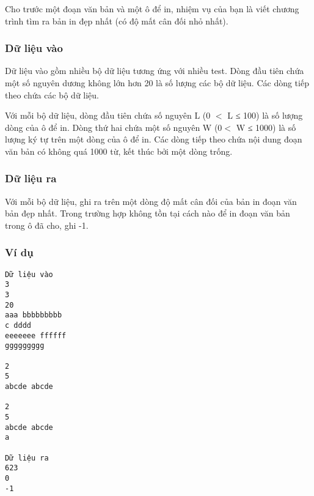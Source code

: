    Cho trước một đoạn văn bản và một ô để in, nhiệm vụ của bạn là viết chương trình tìm ra bản in đẹp nhất (có độ mất cân đối nhỏ nhất).  

\subsubsection{   Dữ liệu vào  }

   Dữ liệu vào gồm nhiều bộ dữ liệu tương ứng với nhiều test. Dòng đầu tiên chứa một số nguyên dương không lớn hơn 20 là số lượng các bộ dữ liệu. Các dòng tiếp theo chứa các bộ dữ liệu.  

   Với mỗi bộ dữ liệu, dòng đầu tiên chứa số nguyên L (0 $<$ L ≤ 100) là số lượng dòng của ô để in. Dòng thứ hai chứa một số nguyên W (0$<$ W ≤ 1000) là số lượng ký tự trên một dòng của ô để in. Các dòng tiếp theo chứa nội dung đoạn văn bản có không quá 1000 từ, kết thúc bởi một dòng trống.  

\subsubsection{   Dữ liệu ra  }

   Với mỗi bộ dữ liệu, ghi ra trên một dòng độ mất cân đối của bản in đoạn văn bản đẹp nhất. Trong trường hợp không tồn tại cách nào để in đoạn văn bản trong ô đã cho, ghi -1.  

\subsubsection{   Ví dụ  }
\begin{verbatim}
Dữ liệu vào
3
3
20
aaa bbbbbbbbb 
c dddd
eeeeeee ffffff
ggggggggg

2
5
abcde abcde

2
5
abcde abcde 
a

Dữ liệu ra
623
0
-1
\end{verbatim}